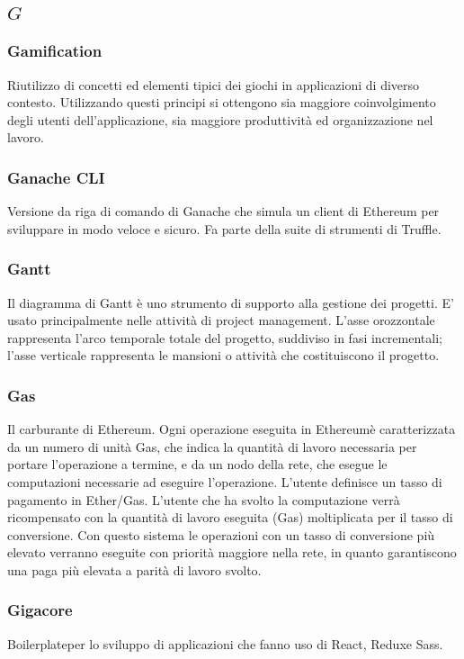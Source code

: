 \subsection*{\quad$G\quad$}
\subsubsection*{Gamification}
Riutilizzo di concetti ed elementi tipici dei giochi in applicazioni di diverso contesto. Utilizzando questi principi si ottengono sia maggiore coinvolgimento degli utenti dell'applicazione, sia maggiore produttività ed organizzazione nel lavoro.

\subsubsection*{Ganache CLI}
Versione da riga di comando di Ganache che simula un client di Ethereum per sviluppare in modo veloce e sicuro. Fa parte della suite di strumenti di Truffle\glo.

\subsubsection*{Gantt}
Il diagramma di Gantt è uno strumento di supporto alla gestione dei progetti. E' usato principalmente nelle attività di project management. L'asse orozzontale rappresenta l'arco temporale totale del progetto, suddiviso in fasi incrementali; l'asse verticale rappresenta le mansioni o attività che costituiscono il progetto.

\subsubsection*{Gas}
Il carburante di Ethereum. Ogni operazione eseguita in Ethereum\glosp è caratterizzata da un numero di unità Gas, che indica la quantità di lavoro necessaria per portare l'operazione a termine, e da un nodo della rete, che esegue le computazioni necessarie ad eseguire l'operazione. L'utente definisce un tasso di pagamento in Ether\glo/Gas. L'utente che ha svolto la computazione verrà ricompensato con la quantità di lavoro eseguita (Gas) moltiplicata per il tasso di conversione. Con questo sistema le operazioni con un tasso di conversione più elevato verranno eseguite con priorità maggiore nella rete, in quanto garantiscono una paga più elevata a parità di lavoro svolto.  

\subsubsection*{Gigacore}
Boilerplate\glosp per lo sviluppo di applicazioni che fanno uso di React\glo, Redux\glosp e Sass\glo.

